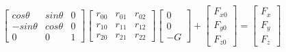 \documentclass[12pt]{article}
\begin{document}
\begin{CJK}{UTF8}{bsmi}
\begin{equation*}
\begin{split}
\begin{bmatrix}
cos\theta	&sin\theta	&0\\
-sin\theta	&cos\theta	&0\\
0			&0			&1	
\end{bmatrix}
\begin{bmatrix}
r_{00}	&r_{01}	&r_{02}\\
r_{10}	&r_{11}	&r_{12}\\
r_{20}	&r_{21}	&r_{22}
\end{bmatrix}
\begin{bmatrix}
0\\
0\\
-G
\end{bmatrix}
+
\begin{bmatrix}
F_{x0}\\
F_{y0}\\
F_{z0}
\end{bmatrix}
=
\begin{bmatrix}
F_x\\
F_y\\
F_z
\end{bmatrix}
\end{split}
\end{equation*}


\end{CJK}
\end{document}
